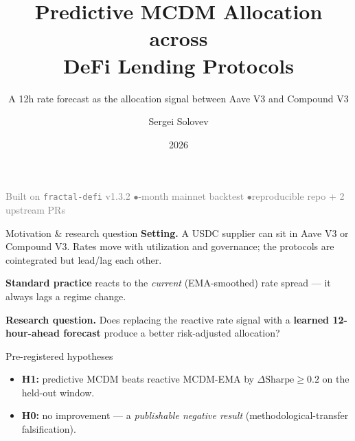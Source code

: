 \documentclass[aspectratio=169,11pt]{beamer}
\title[Predictive MCDM DeFi Allocation]{Predictive MCDM Allocation across\\DeFi Lending Protocols}
\subtitle{A 12h rate forecast as the allocation signal between Aave V3 and Compound V3}
\author[S.\,Solovev]{Sergei Solovev}
\institute[HSE FCS]{Faculty of Computer Science, HSE University\\DeFi-Strategies --- Project 2}
\date{2026}
\begin{document}
\begin{frame}[plain]
  \titlepage
  \begin{center}
    \footnotesize\textcolor{gray}{Built on \texttt{fractal-defi} v1.3.2 \quad$\bullet$-month mainnet backtest \quad$\bullet$\quad reproducible repo + 2 upstream PRs}
  \end{center}
\end{frame}

\begin{frame}{Motivation \& research question}
  \textbf{Setting.} A USDC supplier can sit in Aave V3 or Compound V3. Rates
  move with utilization and governance; the protocols are cointegrated but
  lead/lag each other.

  \medskip
  \textbf{Standard practice} reacts to the \emph{current} (EMA-smoothed)
  rate spread --- it always lags a regime change.

  \medskip
  \textbf{Research question.} Does replacing the reactive rate signal with a
  \textbf{learned 12-hour-ahead forecast} produce a better risk-adjusted
  allocation?

  \medskip
  \begin{block}{Pre-registered hypotheses}
    \begin{itemize}
      \item \textbf{H1:} predictive MCDM beats reactive MCDM-EMA by
            $\Delta\text{Sharpe}\ge 0.2$ on the held-out window.
      \item \textbf{H0:} no improvement --- a \emph{publishable negative
            result} (methodological-transfer falsification).
    \end{itemize}
  \end{block}
\end{frame}
\end{document}
